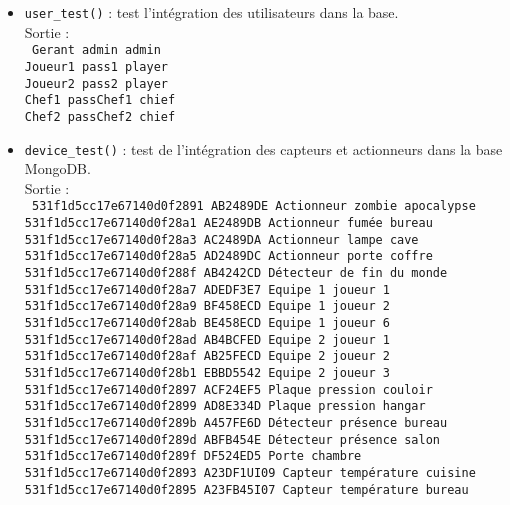 \begin{itemize}
	\item \texttt{user\_test()} : test l'intégration des utilisateurs dans la base.\\ 
	Sortie : \\
	\texttt{
	Gerant admin admin\\
	Joueur1 pass1 player\\
	Joueur2 pass2 player\\
	Chef1 passChef1 chief\\
	Chef2 passChef2 chief\\
	}

	\item \texttt{device\_test()} : test de l'intégration des capteurs et actionneurs dans la base MongoDB.\\
	Sortie : \\
	\texttt{
	531f1d5cc17e67140d0f2891   AB2489DE   Actionneur zombie apocalypse\\
	531f1d5cc17e67140d0f28a1   AE2489DB   Actionneur fumée bureau\\
	531f1d5cc17e67140d0f28a3   AC2489DA   Actionneur lampe cave\\
	531f1d5cc17e67140d0f28a5   AD2489DC   Actionneur porte coffre\\
	531f1d5cc17e67140d0f288f   AB4242CD   Détecteur de fin du monde\\
	531f1d5cc17e67140d0f28a7   ADEDF3E7   Equipe 1 joueur 1\\
	531f1d5cc17e67140d0f28a9   BF458ECD   Equipe 1 joueur 2\\
	531f1d5cc17e67140d0f28ab   BE458ECD   Equipe 1 joueur 6\\
	531f1d5cc17e67140d0f28ad   AB4BCFED   Equipe 2 joueur 1\\
	531f1d5cc17e67140d0f28af   AB25FECD   Equipe 2 joueur 2\\
	531f1d5cc17e67140d0f28b1   EBBD5542   Equipe 2 joueur 3\\
	531f1d5cc17e67140d0f2897   ACF24EF5   Plaque pression couloir\\
	531f1d5cc17e67140d0f2899   AD8E334D   Plaque pression hangar\\
	531f1d5cc17e67140d0f289b   A457FE6D   Détecteur présence bureau\\
	531f1d5cc17e67140d0f289d   ABFB454E   Détecteur présence salon\\
	531f1d5cc17e67140d0f289f   DF524ED5   Porte chambre\\
	531f1d5cc17e67140d0f2893   A23DF1UI09   Capteur température cuisine\\
	531f1d5cc17e67140d0f2895   A23FB45I07   Capteur température bureau\\
	}
\end{itemize}

